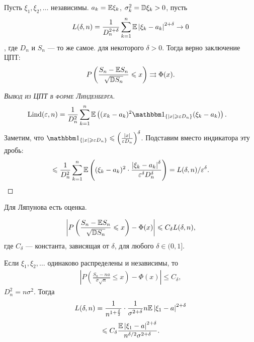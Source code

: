 \documentclass[../main.tex]{subfiles}
\begin{document}
\begin{thm}
 Пусть $ \xi_1, \xi_2, \ldots $ независимы. $ a_k = \mathbb E \xi_k $, $ \sigma_k^{2} = \mathbb D \xi_k > 0 $, пусть
 \begin{align*}
  L(\delta, n) = \frac{1}{D_n^{2+\delta}} \sum_{k=1}^{n} \mathbb E \left| \xi_k - a_k \right|^{2 + \delta} \to 0
 \end{align*}, где $ D_n $ и $ S_n $ --- то же самое. для некоторого $ \delta  > 0 $. Тогда верно заключение ЦПТ:
 \begin{align*}
  P \left( \frac{S_n - \mathbb E S_n}{\sqrt{\mathbb D S_n}} \leqslant x \right) \rightrightarrows \Phi(x).
 \end{align*}
\end{thm}
\begin{proof}[\normalfont\textsc{Вывод из ЦПТ в форме Линденберга}]
 \begin{align*}
  \mathrm{Lind}(\eps, n) &= \frac{1}{D_n^{2}} \sum_{k=1}^{n} \E \left( (x_k-a_k)^{2}\Ind_{\left\{ \left| x \right| \geqslant \eps D_n\right\}}(\xi_k - a_k) \right).
 \end{align*} Заметим, что $ \Ind_{\left\{ \left| x \right| \geqslant \eps D_n \right\}} \leqslant \left(\frac{\left| x \right|}{\eps D_n} \right)^{\delta} $. Подставим вместо индикатора эту дробь:
 \begin{align*}
  \leqslant \frac{1}{D_n^{2}} \sum_{k=1}^{n} \mathbb E \left( (\xi_k-a_k)^{2} \cdot \frac{\left| \xi_k-a_k \right|^{\delta}}{\varepsilon^{\delta} D_n^{\delta}} \right) = L(\delta, n) / \varepsilon^{\delta}.
 \end{align*} 
\end{proof}Для Ляпунова есть оценка.
\begin{thm}
 \begin{align*}
  \left| P \left( \frac{S_n-\mathbb E S_n}{\sqrt{\mathbb D S_n}} \leqslant x\right) - \Phi(x) \right| \leqslant C_\delta L(\delta, n),
 \end{align*} где $ C_\delta $ --- константа, зависящая от $ \delta $, для любого $ \delta \in (0, 1] $.
\end{thm}
\begin{crly}
 Если $ \xi_1, \xi_2, \ldots $  одинаково распределены и независимы, то
 \begin{align*}
  \left| P \left( \frac{S_n - na}{\sigma \sqrt n} \leqslant x \right) - \Phi(x) \right| \leqslant C_\delta,
 \end{align*} $ D_n^{2} = n\sigma^{2} $. Тогда
 \begin{align*}
  L(\delta, n) = \frac{1}{n^{1 + \frac{\delta}{2}}} \cdot \frac{1}{\sigma^{2 + \delta}} n \mathbb E \left| \xi_1 - a \right|^{2 + \delta}
 \end{align*}
 \begin{align*}
  \leqslant C_\delta \frac{\mathbb E \left| \xi_1 - a \right|^{2+\delta}}{n^{\delta / 2} \sigma^{2 + \delta}}.
 \end{align*}
\end{crly}
\end{document}
